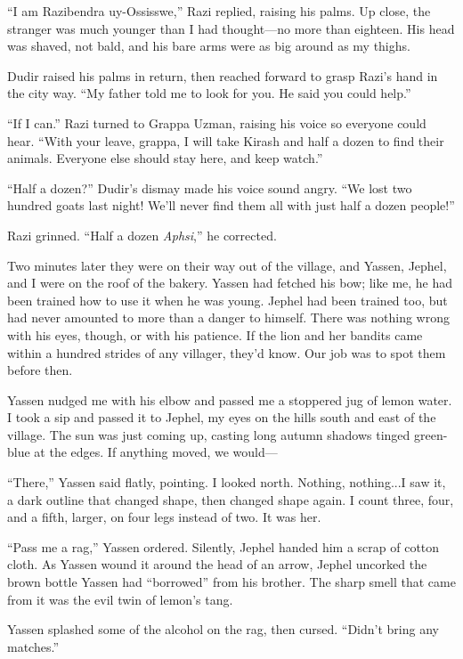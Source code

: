 ``I am Razibendra uy-Ossisswe,'' Razi replied, raising his palms.  Up
close, the stranger was much younger than I had thought---no more than
eighteen.  His head was shaved, not bald, and his bare arms were as
big around as my thighs.

Dudir raised his palms in return, then reached forward to grasp Razi's
hand in the city way.  ``My father told me to look for you.  He said
you could help.''

``If I can.''  Razi turned to Grappa Uzman, raising his voice so
everyone could hear.  ``With your leave, grappa, I will take Kirash and
half a dozen to find their animals.  Everyone else should stay here,
and keep watch.''

``Half a dozen?''  Dudir's dismay made his voice sound angry.  ``We lost
two hundred goats last night!  We'll never find them all with just
half a dozen people!''

Razi grinned.  ``Half a dozen \emph{Aphsi},'' he corrected.

Two minutes later they were on their way out of the village, and
Yassen, Jephel, and I were on the roof of the bakery.  Yassen had
fetched his bow; like me, he had been trained how to use it when he
was young.  Jephel had been trained too, but had never amounted to
more than a danger to himself.  There was nothing wrong with his eyes,
though, or with his patience.  If the lion and her bandits came within
a hundred strides of any villager, they'd know.  Our job was to spot
them before then.

Yassen nudged me with his elbow and passed me a stoppered jug of lemon
water.  I took a sip and passed it to Jephel, my eyes on the hills
south and east of the village.  The sun was just coming up, casting
long autumn shadows tinged green-blue at the edges.  If anything
moved, we would---

``There,'' Yassen said flatly, pointing.  I looked north.  Nothing,
nothing...I saw it, a dark outline that changed shape, then changed
shape again.  I count three, four, and a fifth, larger, on four legs
instead of two.  It was her.

``Pass me a rag,'' Yassen ordered.  Silently, Jephel handed him a scrap
of cotton cloth.  As Yassen wound it around the head of an arrow,
Jephel uncorked the brown bottle Yassen had ``borrowed'' from his
brother.  The sharp smell that came from it was the evil twin of
lemon's tang.

Yassen splashed some of the alcohol on the rag, then cursed.  ``Didn't
bring any matches.''

